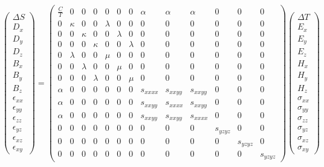 {\small\begin{equation}
	\left(\begin{matrix}
	\Delta S\\\hline D_x\\ D_y\\ D_z\\\hline B_x\\ B_y\\ B_z\\\hline \epsilon_{xx}\\ \epsilon_{yy}\\ \epsilon_{zz}\\ \epsilon_{yz}\\ \epsilon_{xz}\\ \epsilon_{xy}\end{matrix}\right) = 
	\left(\begin{array}{c|ccc|ccc|cccccc}
	\frac{C}{T} & 0 & 0 & 0 & 0 & 0 & 0 & \alpha & \alpha & \alpha & 0 & 0 &0\\\hline
	0 & \kappa & 0 & 0 & \lambda & 0 & 0  & 0 & 0 & 0 & 0 & 0 & 0\\
	0 & 0 & \kappa & 0 & 0 & \lambda & 0 & 0 & 0 & 0 & 0 & 0 & 0\\
	0 & 0 & 0 & \kappa & 0 & 0 & \lambda                   & 0 & 0 & 0 & 0 & 0 & 0\\\hline
	0 & \lambda & 0   & 0 & \mu & 0 & 0  &0 & 0 & 0 & 0 & 0 & 0\\
	0 & 0 & \lambda    & 0 & 0 & \mu & 0  &0 &0 & 0 & 0 & 0 & 0\\
	0 & 0 & 0 & \lambda                      & 0 & 0 & \mu &0 & 0 & 0 & 0 & 0 & 0\\\hline
	\alpha & 0 & 0 & 0     & 0 & 0 & 0                      & s_{xxxx} & s_{xxyy} & s_{xxyy} & 0 & 0 & 0\\
	\alpha & 0 & 0 & 0    & 0 & 0 & 0                       & s_{xxyy} & s_{xxxx} & s_{xxyy} & 0 & 0 & 0\\
	\alpha & 0 & 0 & 0    & 0 & 0 & 0                       & s_{xxyy} & s_{xxyy} & s_{xxxx} & 0 & 0 & 0\\
	0 & 0 & 0 & 0               & 0 & 0 & 0                                & 0 & 0 & 0 & s_{yzyz} & 0 & 0\\
	0 & 0 & 0 & 0 & 0 & 0 & 0      & 0 & 0 & 0                                         & 0 & s_{yzyz} & 0\\
	0 & 0 & 0 & 0 & 0 & 0 & 0      & 0 & 0 & 0                                         & 0 & 0 & s_{yzyz}
	\end{array}\right)
	\left(\begin{matrix}
	\Delta T\\\hline E_x\\ E_y\\ E_z\\\hline H_x\\ H_y\\ H_z\\\hline \sigma_{xx}\\ \sigma_{yy}\\ \sigma_{zz}\\ \sigma_{yz}\\ \sigma_{xz}\\ \sigma_{xy}\end{matrix}\right)  
\end{equation}}
